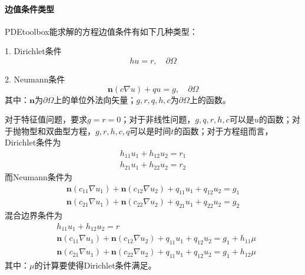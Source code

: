         \paragraph{边值条件类型}PDEtoolbox能求解的方程边值条件有如下几种类型：
        \par
        1. Dirichlet条件
        \[
            hu = r,\quad \partial \Omega
        \]
        \par
        2. Neumann条件
        \[
            \mathbf{n} (c\nabla u)+qu = g,\quad \partial \Omega
        \]
        其中：$\mathbf{n}$为$\partial \Omega$上的单位外法向矢量；$g,r,q,h,c$为$\partial \Omega$上的函数。
        \par
        对于特征值问题，要求$g = r =0$；对于非线性问题，$g,q,r,h,c$可以是$u$的函数；对于抛物型和双曲型方程，$g,r,h,c,q$可以是时间$t$的函数；对于方程组而言，Dirichlet条件为
        \begin{align*}
            h_{11} u_1 +h_{12}u_2 = r_1\\
            h_{21} u_1 +h_{22}u_2 = r_2
        \end{align*}
        而Neumann条件为
        \begin{align*}
            \mathbf{n} (c_{11} \nabla u_1) + \mathbf{n} (c_{12} \nabla u_2) + q_{11}u_1 + q_{12} u_2 = g_1 \\
            \mathbf{n} (c_{21} \nabla u_1) + \mathbf{n} (c_{22} \nabla u_2) + q_{21}u_1 + q_{22} u_2 = g_2
        \end{align*}
        混合边界条件为
        \begin{align*}
            &h_{11}u_1 +h_{12}u_2 = r\\
            &\mathbf{n} (c_{11} \nabla u_1) + \mathbf{n} (c_{12} \nabla u_2) + q_{11}u_1 + q_{12} u_2 = g_1 + h_{11}\mu\\
            &\mathbf{n} (c_{21} \nabla u_1) + \mathbf{n} (c_{22} \nabla u_2) + q_{11}u_1 + q_{12} u_2 = g_1 + h_{12}\mu
        \end{align*}
        其中：$\mu$的计算要使得Dirichlet条件满足。
